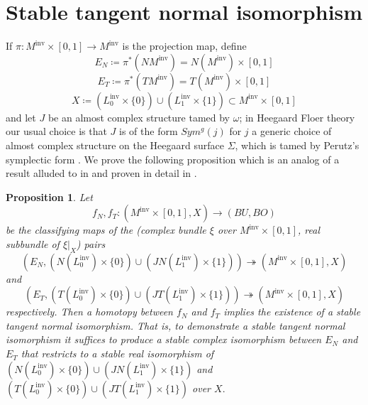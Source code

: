 \documentclass[11pt]{amsart}
\newtheorem{proposition}[theorem]{Proposition}
\theoremstyle{definition}
\theoremstyle{remark}
\newcommand{\M}{M^{\operatorname{inv}}}
\newcommand{\Lo}{L_0^{\operatorname{inv}}}
\newcommand{\Li}{L_1^{\operatorname{inv}}}
\numberwithin{equation}{section}
\begin{document}
\section{Stable tangent normal isomorphism} \label{stableTNiso}
 If $\pi\colon \M\times[0,1]\rightarrow\M$ is the projection map, define \begin{equation}E_N\coloneq \pi^*(N\M)=N(\M)\times[0,1]\end{equation}\begin{equation} E_T\coloneq \pi^*(T\M)=T(\M)\times[0,1]\end{equation}\begin{equation}X\coloneq (\Lo\times\{0\})\cup(\Li\times\{1\})\subset \M\times[0,1]\end{equation} and let $J$ be an almost complex structure tamed by $\omega$; in Heegaard Floer theory our usual choice is that $J$ is of the form $Sym^g(j)$ for $j$ a generic choice of almost complex structure on the Heegaard surface $\Sigma$, which is tamed by Perutz's symplectic form \cite{perutz}. We prove the following proposition which is an analog of a result alluded to in \cite[~Section 3d]{SS} and proven in detail in  \cite[~Proposition 7.1]{Hendricks2012rank}.
\begin{proposition}\label{symptocomp}
    Let \begin{equation*}
        f_N,f_T\colon (\M\times [0,1],X)\to (BU,BO)
    \end{equation*}
be the classifying maps of the (complex bundle $\xi$ over $\M\times [0,1]$, real subbundle of $\xi|_X$) pairs\[(E_N,(N(\Lo)\times\{0\})\cup (JN(\Li)\times\{1\}))\twoheadrightarrow(\M\times[0,1],X)\] and \[(E_T,(T(\Lo)\times\{0\})\cup (JT(\Li)\times\{1\}))\twoheadrightarrow(\M\times[0,1],X)\] 
respectively. Then a homotopy between $f_N$ and $f_T$ implies the existence of a stable tangent normal isomorphism. That is, to demonstrate a stable tangent normal isomorphism it suffices to produce a stable complex isomorphism between $E_N$ and $E_T$ that restricts to a stable real isomorphism of $(N(\Lo)\times\{0\})\cup (JN(\Li)\times\{1\})$ and $(T(\Lo)\times\{0\})\cup (JT(\Li)\times\{1\})$ over $X.$
\end{proposition}
\end{document}
